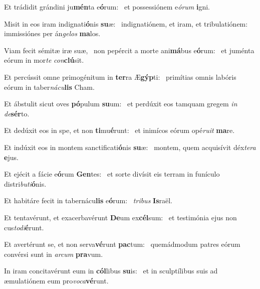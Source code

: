 \item Et trádidit grándini ju\textbf{mén}ta e\textbf{ó}rum:~\psstar{} et possessiónem e\textit{órum} \textbf{i}gni.

\item Misit in eos iram indignati\textbf{ó}nis \textbf{su}æ:~\psstar{} indignatiónem, et iram, et tribulatiónem: immissiónes per án\textit{gelos} \textbf{ma}los.

\item Viam fecit sémitæ iræ suæ,~\pscross{} non pepércit a morte ani\textbf{má}bus e\textbf{ó}rum:~\psstar{} et juménta eórum in mor\textit{te} \textit{con}\textbf{clú}sit.

\item Et percússit omne primogénitum in \textbf{ter}ra Æ\textbf{gýp}ti:~\psstar{} primítias omnis labóris eórum in taber\textit{nácu}\textbf{lis} Cham.

\item Et ábstulit sicut oves \textbf{pó}pulum \textbf{su}um:~\psstar{} et perdúxit eos tamquam gregem \textit{in} \textit{de}\textbf{sér}to.

\item Et dedúxit eos in spe, et non \textbf{ti}mu\textbf{é}runt:~\psstar{} et inimícos eórum opé\textit{ruit} \textbf{ma}re.

\item Et indúxit eos in montem sanctificati\textbf{ó}nis \textbf{su}æ:~\psstar{} montem, quem acquisívit déx\textit{tera} \textbf{e}jus.

\item Et ejécit a fácie e\textbf{ó}rum \textbf{Gen}tes:~\psstar{} et sorte divísit eis terram in funículo distri\textit{buti}\textbf{ó}nis.

\item Et habitáre fecit in tabernácu\textbf{lis} e\textbf{ó}rum:~\psstar{} \textit{tribus} \textbf{Is}raël.

\item Et tentavérunt, et exacerbavérunt \textbf{De}um ex\textbf{cél}sum:~\psstar{} et testimónia ejus non cus\textit{todi}\textbf{é}runt.

\item Et avertérunt se, et non serva\textbf{vé}runt \textbf{pac}tum:~\psstar{} quemádmodum patres eórum convérsi sunt in \textit{arcum} \textbf{pra}vum.

\item In iram concitavérunt eum in \textbf{cól}libus \textbf{su}is:~\psstar{} et in sculptílibus suis ad æmulatiónem eum pro\textit{voca}\textbf{vé}runt.

